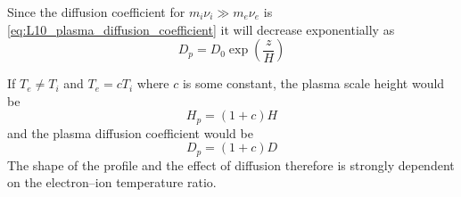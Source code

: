 Since the diffusion coefficient for \(m_i\nu_i\gg m_e\nu_e\) is \cref{eq:L10_plasma_diffusion_coefficient} it will decrease exponentially as
\begin{equation*}
    D_p=D_0\exp\left(\frac{z}{H}\right)
\end{equation*}

If \(T_e\neq T_i\) and \(T_e=cT_i\) where \(c\) is some constant, the plasma scale height would be
\begin{equation*}
    H_p=(1+c)H
\end{equation*}
and the plasma diffusion coefficient would be
\begin{equation*}
    D_p=(1+c)D
\end{equation*}
The shape of the profile and the effect of diffusion therefore is strongly dependent
on the electron–ion temperature ratio.